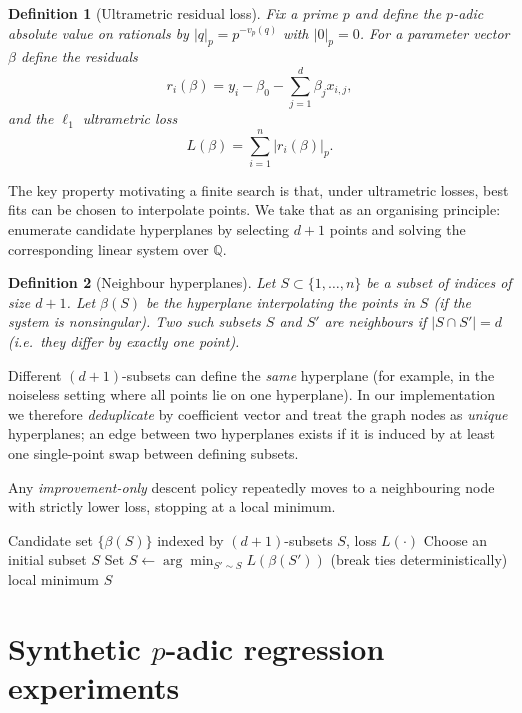 \documentclass[11pt]{article}
\newtheorem{definition}{Definition}
\begin{document}
\begin{definition}[Ultrametric residual loss]
Fix a prime $p$ and define the $p$-adic absolute value on rationals by $|q|_p = p^{-v_p(q)}$ with $|0|_p=0$. For a parameter vector $\beta$ define the residuals
\[
r_i(\beta) = y_i - \beta_0 - \sum_{j=1}^d \beta_j x_{i,j},
\]
and the $\ell_1$ ultrametric loss
\[
L(\beta) = \sum_{i=1}^n |r_i(\beta)|_p.
\]
\end{definition}

The key property motivating a finite search is that, under ultrametric losses, best fits can be chosen to interpolate points. We take that as an organising principle: enumerate candidate hyperplanes by selecting $d{+}1$ points and solving the corresponding linear system over $\mathbb{Q}$.

\begin{definition}[Neighbour hyperplanes]
Let $S\subset\{1,\dots,n\}$ be a subset of indices of size $d{+}1$. Let $\beta(S)$ be the hyperplane interpolating the points in $S$ (if the system is nonsingular). Two such subsets $S$ and $S'$ are \emph{neighbours} if $|S\cap S'| = d$ (i.e.\ they differ by exactly one point).
\end{definition}

Different $(d{+}1)$-subsets can define the \emph{same} hyperplane (for example, in the noiseless setting where all points lie on one hyperplane). In our implementation we therefore \emph{deduplicate} by coefficient vector and treat the graph nodes as \emph{unique} hyperplanes; an edge between two hyperplanes exists if it is induced by at least one single-point swap between defining subsets.

Any \emph{improvement-only} descent policy repeatedly moves to a neighbouring node with strictly lower loss, stopping at a local minimum.

\begin{algorithm}[t]
\caption{Steepest-descent walk on neighbour hyperplanes}
\begin{algorithmic}[1]
\Require Candidate set $\{\beta(S)\}$ indexed by $(d{+}1)$-subsets $S$, loss $L(\cdot)$
\State Choose an initial subset $S$
  \State Set $S \gets \arg\min_{S' \sim S} L(\beta(S'))$ (break ties deterministically)
\EndWhile
\State \Return local minimum $S$
\end{algorithmic}
\end{algorithm}

\section{Synthetic $p$-adic regression experiments}
\end{document}
